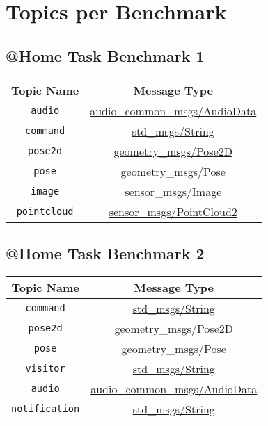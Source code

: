\documentclass[a4paper]{article}
\begin{document}
\section{Topics per Benchmark}

\subsection{@Home Task Benchmark 1}
\begin{center}
\begin{tabular}{|c|c|}\hline
Topic Name & Message Type \\\hline\hline
\verb!audio! & \href{http://docs.ros.org/hydro/api/audio\_common\_msgs/html/msg/AudioData.html}{audio\_common\_msgs/AudioData} \\\hline
\verb!command! & \href{http://docs.ros.org/api/std\_msgs/html/msg/String.html}{std\_msgs/String} \\\hline
\verb!pose2d! & \href{http://docs.ros.org/api/geometry\_msgs/html/msg/Pose2D.html}{geometry\_msgs/Pose2D} \\\hline
\verb!pose! & \href{http://docs.ros.org/api/geometry\_msgs/html/msg/Pose.html}{geometry\_msgs/Pose} \\\hline
\verb!image! & \href{http://docs.ros.org/api/sensor\_msgs/html/msg/Image.html}{sensor\_msgs/Image} \\\hline
\verb!pointcloud! & \href{http://docs.ros.org/api/sensor\_msgs/html/msg/PointCloud2.html}{sensor\_msgs/PointCloud2} \\\hline
\end{tabular}
\end{center}


\subsection{@Home Task Benchmark 2}
\begin{center}
\begin{tabular}{|c|c|}\hline
Topic Name & Message Type \\\hline\hline
\verb!command! & \href{http://docs.ros.org/api/std\_msgs/html/msg/String.html}{std\_msgs/String} \\\hline
\verb!pose2d! & \href{http://docs.ros.org/api/geometry\_msgs/html/msg/Pose2D.html}{geometry\_msgs/Pose2D} \\\hline
\verb!pose! & \href{http://docs.ros.org/api/geometry\_msgs/html/msg/Pose.html}{geometry\_msgs/Pose} \\\hline
\verb!visitor! & \href{http://docs.ros.org/api/std\_msgs/html/msg/String.html}{std\_msgs/String} \\\hline
\verb!audio! & \href{http://docs.ros.org/hydro/api/audio\_common\_msgs/html/msg/AudioData.html}{audio\_common\_msgs/AudioData} \\\hline
\verb!notification! & \href{http://docs.ros.org/api/std\_msgs/html/msg/String.html}{std\_msgs/String} \\\hline
\end{tabular}
\end{center}
\end{document}
